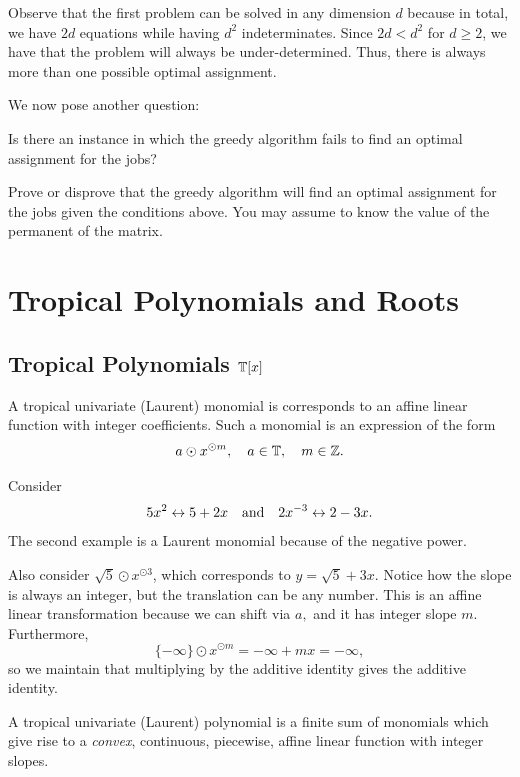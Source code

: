 \documentclass[12pt]{memoir}
\theoremstyle{definition}
\begin{document}
\begin{Rmk}
Observe that the first problem can be solved in any dimension $d$ because in total, we have $2d$ equations while having $d^2$ indeterminates. Since $2d<d^2$ for $d\geq 2$, we have that the problem will always be under-determined. Thus, there is always more than one possible optimal assignment. 
\end{Rmk}

We now pose another question: 
\begin{significant}
    Is there an instance in which the greedy algorithm fails to find an optimal assignment for the jobs?
\end{significant}

\begin{Ej}
Prove or disprove that the greedy algorithm will find an optimal assignment for the jobs given the conditions above. You may assume to know the value of the permanent of the matrix.
\end{Ej}


\section{Tropical Polynomials and Roots}

\subsection{Tropical Polynomials $\mathbb{T}[x]$}

A tropical univariate (Laurent) monomial is corresponds to an affine linear function with integer coefficients. Such a monomial is an expression of the form 
$$a\odot x^{\odot m},\quad a\in\mathbb{T},\quad m\in\mathbb{Z}.$$

\begin{Ex}
    Consider
    $$5x^2\leftrightarrow 5+2x\quad\text{and}\quad 2x^{-3}\leftrightarrow 2-3x.$$
    The second example is a Laurent monomial because of the negative power.\par
    Also consider $\sqrt 5\odot x^{\odot 3}$, which corresponds to $y=\sqrt{5}+3x$. Notice how the slope is always an integer, but the translation can be any number. This is an affine linear transformation because we can shift via $a,$ and it has integer slope $m.$ Furthermore, $$\{-\infty\}\odot x^{\odot m} = -\infty + mx = - \infty,$$ so we maintain that multiplying by the additive identity gives the additive identity.
\end{Ex}

A tropical univariate (Laurent) polynomial is a finite sum of monomials which give rise to a \emph{convex}, continuous, piecewise, affine linear function with integer slopes. 
\end{document}
